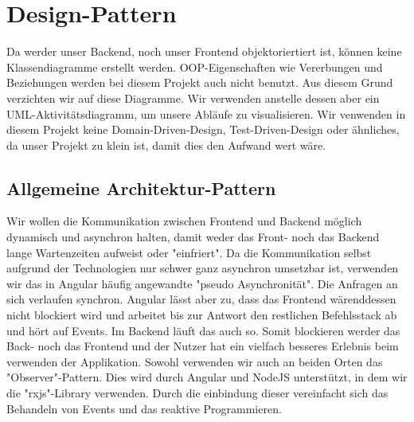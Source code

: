 	\section{Design-Pattern}
	Da werder unser Backend, noch unser Frontend objektoriertiert ist, können keine Klassendiagramme erstellt werden. OOP-Eigenschaften wie Vererbungen und Beziehungen werden bei diesem Projekt auch nicht benutzt. Aus diesem Grund verzichten wir auf diese Diagramme. Wir verwenden anstelle dessen aber ein UML-Aktivitäts\-diagramm, um unsere Abläufe zu visualisieren. Wir venwenden in diesem Projekt keine Domain-Driven-Design, Test-Driven-Design oder ähnliches, da unser Projekt zu klein ist, damit dies den Aufwand wert wäre.

	\subsection{Allgemeine Architektur-Pattern}
	Wir wollen die Kommunikation zwischen Frontend und Backend möglich dynamisch und asynchron halten, damit weder das Front- noch das Backend lange Wartenzeiten aufweist oder "einfriert". Da die Kommunikation selbst aufgrund der Technologien nur schwer ganz asynchron umsetzbar ist, verwenden wir das in Angular häufig angewandte "pseudo Asynchronität". Die Anfragen an sich verlaufen synchron. Angular lässt aber zu, dass das Frontend wärenddessen nicht blockiert wird und arbeitet bis zur Antwort den restlichen Befehlsstack ab und hört auf Events. Im Backend läuft das auch so. Somit blockieren werder das Back- noch das Frontend und der Nutzer hat ein vielfach besseres Erlebnis beim verwenden der Applikation. Sowohl verwenden wir auch an beiden Orten das "Observer"-Pattern. Dies wird durch Angular und NodeJS unterstützt, in dem wir die "rxjs"-Library verwenden. Durch die einbindung dieser vereinfacht sich das Behandeln von Events und das reaktive Programmieren.

